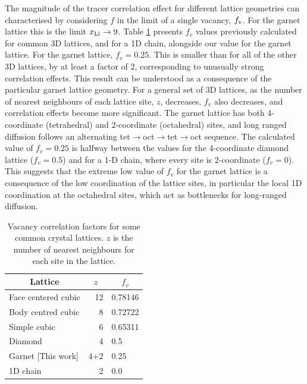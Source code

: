 \documentclass[aps,prb,twocolumn,superscriptaddress,reprint]{revtex4-1}
\newcommand{\xLi}{x_\m{Li}}
\begin{document}
The magnitude of the tracer correlation effect for different lattice geometries can characterised by considering $f$ in the limit of a single vacancy, $f_{\mathrm{v}}$. 
For the garnet lattice this is the limit $\xLi\to9$. 
Table \ref{tab:vacancy_correlation_factors} presents $f_v$ values previously calculated for common 3D lattices,\cite{CompaanAndHaven_TransFaradaySoc1956} and for a 1D chain,\cite{Mehrer_DiffusionBook} alongside our value for the garnet lattice. 
For the garnet lattice, $f_v=0.25$. 
This is smaller than for all of the other 3D lattices, by at least a factor of 2, corresponding to unusually strong correlation effects. 
This result can be understood as a consequence of the particular garnet lattice geometry. 
For a general set of 3D lattices, as the number of nearest neighbours of each lattice site, $z$, decreases, $f_v$ also decreases, and correlation effects become more significant. 
The garnet lattice has both 4-coordinate (tetrahedral) and 2-coordinate (octahedral) sites, and long ranged diffusion follows an alternating tet$\to$oct$\to$tet$\to$oct sequence. 
The calculated value of $f_v=0.25$ is halfway between the values for the 4-coordinate diamond lattice ($f_v=0.5$) and for a 1-D chain, where every site is 2-coordinate ($f_v=0$).\cite{Mehrer_DiffusionBook} 
This suggests that the extreme low value of $f_v$ for the garnet lattice is a consequence of the low coordination of the lattice sites, in particular the local 1D coordination at the octahedral sites, which act as bottlenecks for long-ranged diffusion. 

\begin{table}[htb]
   \begin{center}
     \begin{tabular}{lrl} \hline
        \multicolumn{1}{c}{Lattice} & \multicolumn{1}{c}{$z$} & \multicolumn{1}{c}{$f_v$} \\ \hline
        Face centered cubic\cite{CompaanAndHaven_TransFaradaySoc1956} & 12 & 0.78146 \\
        Body centred cubic\cite{CompaanAndHaven_TransFaradaySoc1956} & 8 & 0.72722 \\
        Simple cubic\cite{CompaanAndHaven_TransFaradaySoc1956} & 6 & 0.65311 \\
        Diamond\cite{CompaanAndHaven_TransFaradaySoc1956} & 4 & 0.5 \\
        Garnet [This work] & 4+2 & 0.25 \\ 
        1D chain\cite{Mehrer_DiffusionBook} & 2 & 0.0 \\ \hline
     \end{tabular}
   \caption{\label{tab:vacancy_correlation_factors}Vacancy correlation factors for some common crystal lattices. $z$ is the number of nearest neighbours for each site in the lattice.}
   \end{center}
 \end{table}
\end{document}
